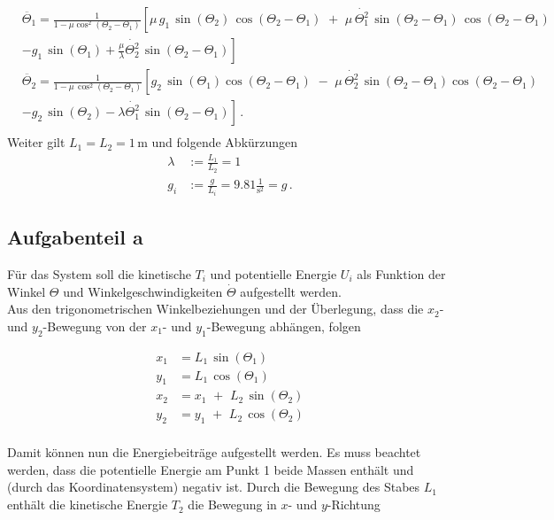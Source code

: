 \begin{equation}
	\begin{split}
		&\ddot{\Theta_1} = \frac{1}{1-\mu \cos^2(\Theta_2-\Theta_1)} \left[ \mu\,g_1\,\sin(\Theta_2)\,\cos(\Theta_2-\Theta_1)\,\, + \,\, \mu\,\dot{\Theta_1^2}\,\sin(\Theta_2-\Theta_1)\,\cos(\Theta_2-\Theta_1)\right.  \\
		&\left.-g_1\,\sin(\Theta_1)+ \frac{\mu}{\lambda} \dot{\Theta_2^2}\,\sin(\Theta_2-\Theta_1)\right]\\
		&\ddot{\Theta_2} = \frac{1}{1-\mu\,\cos^2(\Theta_2-\Theta_1)}\left[g_2\,\sin(\Theta_1)\cos(\Theta_2-\Theta_1)\,\,-\,\,\mu\,\dot{\Theta_2^2}\,\sin(\Theta_2-\Theta_1)\cos(\Theta_2-\Theta_1)\right. \\
		&\left.-g_2\,\sin(\Theta_2)-\lambda\dot{\Theta_1^2}\,\sin(\Theta_2-\Theta_1)\right]\,. \\
	\end{split}
\label{eq:DGL}
\end{equation}
Weiter gilt $L_1 = L_2 = 1\,\mathup{m}$ und folgende Abkürzungen
\begin{equation*}
	\begin{split}
		 \lambda &:= \frac{L_1}{L_2} = 1 \\
		 g_i &:= \frac{g}{L_i} = 9.81 \frac{1}{\mathup{s}^2} = g \,.
	\end{split}
\end{equation*}
\subsection*{Aufgabenteil a}
Für das System soll die kinetische $T_i$ und potentielle Energie $U_i$ als Funktion der Winkel $\Theta$ und Winkelgeschwindigkeiten $\dot{\Theta}$ aufgestellt werden.\\
Aus den trigonometrischen Winkelbeziehungen und der Überlegung, dass die $x_2$- und $y_2$-Bewegung von der $x_1$- und $y_1$-Bewegung abhängen, folgen

\begin{equation*}
	\begin{split}
		x_1 &= L_1\,\sin(\Theta_1) \\
		y_1 &= L_1\,\cos(\Theta_1) \\
		x_2 &= x_1\,\,+\,\,L_2\,\sin(\Theta_2)\\
		y_2 &= y_1\,\,+\,\,L_2\,\cos(\Theta_2)\\
	\end{split}	
\end{equation*}

Damit können nun die Energiebeiträge aufgestellt werden. Es muss beachtet werden, dass die potentielle Energie am Punkt 1 beide Massen enthält und (durch das Koordinatensystem) negativ ist. Durch die Bewegung des Stabes $L_1$ enthält die kinetische Energie $T_2$ die Bewegung in $x$- und $y$-Richtung


